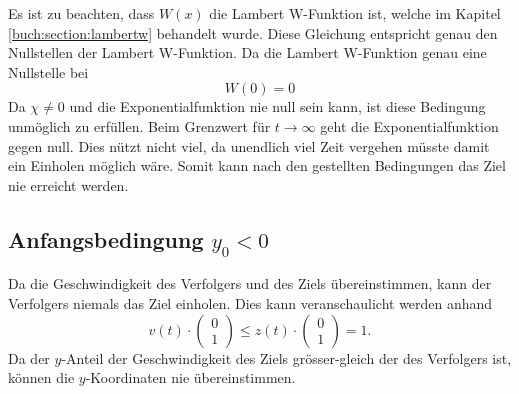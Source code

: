 %
Es ist zu beachten, dass $W(x)$ die Lambert W-Funktion ist, welche im Kapitel  \eqref{buch:section:lambertw} behandelt wurde.
Diese Gleichung entspricht genau den Nullstellen der Lambert W-Funktion. Da die Lambert W-Funktion genau eine Nullstelle bei
\begin{equation}
    W(0)=0
\end{equation}
%
Da $\chi\neq0$ und die Exponentialfunktion nie null sein kann, ist diese Bedingung unmöglich zu erfüllen.
Beim Grenzwert für $t\rightarrow\infty$ geht die Exponentialfunktion gegen null.
Dies nützt nicht viel, da unendlich viel Zeit vergehen müsste damit ein Einholen möglich wäre.
Somit kann nach den gestellten Bedingungen das Ziel nie erreicht werden.
%
%
%
%
%
%
%
%
%
\subsection{Anfangsbedingung $y_0<0$}
Da die Geschwindigkeit des Verfolgers und des Ziels übereinstimmen, kann der Verfolgers niemals das Ziel einholen.
Dies kann veranschaulicht werden anhand
%
\begin{equation}
    v(t)\cdot \left( \begin{array}{c} 0 \\ 1 \end{array}\right) 
    \leq
    z(t)\cdot \left( \begin{array}{c} 0 \\ 1 \end{array}\right) 
    =
    1\text{.}
\end{equation}
%
Da der $y$-Anteil der Geschwindigkeit des Ziels grösser-gleich der des Verfolgers ist, können die $y$-Koordinaten nie übereinstimmen.
%

